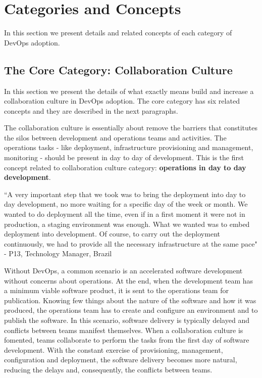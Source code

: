 \section{Categories and Concepts} \label{sec:categories_concepts}
In this section we present details and related concepts of each category of
DevOps adoption.

\subsection{The Core Category: Collaboration Culture}
In this section we present the details of what exactly means build and
increase a collaboration culture in DevOps adoption. The core category has six
related concepts and they are described in the next paragraphs.

The collaboration culture is essentially about remove the barriers that
constitutes the silos between development and operations teams and activities.
The operations tasks - like deployment, infrastructure provisioning and
management, monitoring - should be present in day to day of development. This
is the first concept related to collaboration culture category:
\textbf{operations in day to day development}.

``A very important step that we took was to bring the deployment into day to day
development, no more waiting for a specific day of the week or month. We wanted
to do deployment all the time, even if in a first moment it were not in
production, a staging environment was enough. What we wanted was to embed
deployment into development. Of course, to carry out the deployment
continuously, we had to provide all the necessary infrastructure at the same
pace" - P13, Technology Manager, Brazil

Without DevOps, a common scenario is an accelerated software development
without concerns about operations. At the end, when the development team has a
minimum viable software product, it is sent to the operations team for
publication. Knowing few things about the nature of the software and how it
was produced, the operations team has to create and configure an environment
and to publish the software. In this scenario, software delivery is typically
delayed and conflicts between teams manifest themselves. When a collaboration
culture is fomented, teams collaborate to perform the tasks from the first day
of software development. With the constant exercise of provisioning, management,
configuration and deployment, the software delivery becomes more natural,
reducing the delays and, consequently, the conflicts between teams.


